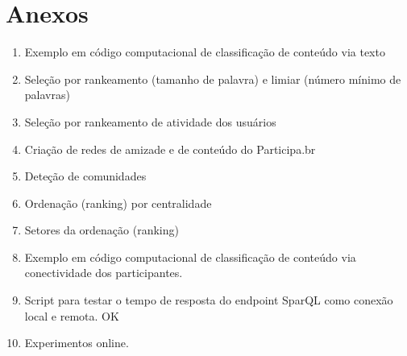 \section*{Anexos}
\begin{enumerate}
\item Exemplo em código computacional de classificação de conteúdo via texto
\item Seleção por rankeamento (tamanho de palavra) e limiar (número mínimo de palavras)
\item Seleção por rankeamento de atividade dos usuários
\item Criação de redes de amizade e de conteúdo do Participa.br
\item Deteção de comunidades
\item Ordenação (ranking) por centralidade
\item Setores da ordenação (ranking)
\item Exemplo em código computacional de classificação de conteúdo via conectividade dos participantes.
\item Script para testar o tempo de resposta do endpoint SparQL como conexão local e remota. OK
\item Experimentos online.
\end{enumerate}

